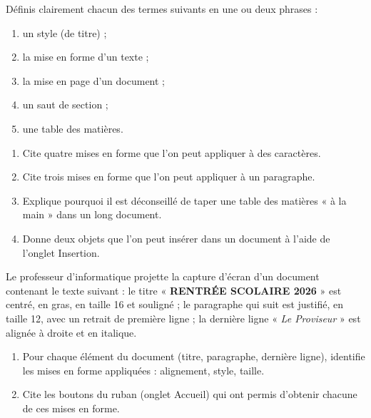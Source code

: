 \documentclass[11pt]{article}
\newcommand{\cle}[1]{{\popxbold\color{popdark}#1}}
\newcounter{popsec}
\newcounter{popsub}
\newcommand{\courssub}[1]{%
  \stepcounter{popsub}%
  \par\vspace{9pt}\noindent{\popxbold\fontsize{11.5}{13}\selectfont\color{popink}{\color{poporange}\thepopsec.\thepopsub}\hspace{6pt}#1}\par\nopagebreak\vspace{4pt}
}
\begin{document}
\begin{exercice}[Définitions]
Définis clairement chacun des termes suivants en une ou deux phrases :
\begin{enumerate}
\item un \cle{style} (de titre) ;
\item la \cle{mise en forme} d'un texte ;
\item la \cle{mise en page} d'un document ;
\item un \cle{saut de section} ;
\item une \cle{table des matières}.
\end{enumerate}
\end{exercice}

\begin{exercice}
\begin{enumerate}
\item Cite quatre mises en forme que l'on peut appliquer à des caractères.
\item Cite trois mises en forme que l'on peut appliquer à un paragraphe.
\item Explique pourquoi il est déconseillé de taper une table des matières « à la main » dans un long document.
\item Donne deux objets que l'on peut insérer dans un document à l'aide de l'onglet Insertion.
\end{enumerate}
\end{exercice}

\courssub{Je m'entraîne}

\begin{exercice}
Le professeur d'informatique projette la capture d'écran d'un document contenant le texte suivant : le titre « \textbf{\large RENTRÉE SCOLAIRE 2026} » est centré, en gras, en taille 16 et souligné ; le paragraphe qui suit est justifié, en taille 12, avec un retrait de première ligne ; la dernière ligne « \emph{Le Proviseur} » est alignée à droite et en italique.
\begin{enumerate}
\item Pour chaque élément du document (titre, paragraphe, dernière ligne), identifie les mises en forme appliquées : alignement, style, taille.
\item Cite les boutons du ruban (onglet Accueil) qui ont permis d'obtenir chacune de ces mises en forme.
\end{enumerate}
\end{exercice}
\end{document}
